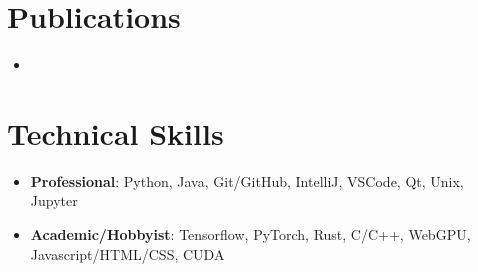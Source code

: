 \documentclass[letterpaper,10pt]{article}
\newcommand{\resumeItem}[1]{\item\small{#1}}
\newcommand{\resumeSubHeadingList}{\begin{itemize}[leftmargin=0.15in, label={}]}
\newcommand{\resumeSubHeadingListEnd}{\end{itemize}}
\begin{document}
\section{Publications}
\resumeSubHeadingList
\vspace{-1pt}\item
\nocite{*}
\printbibliography[heading=none]
\resumeSubHeadingListEnd

\section{Technical Skills}
\resumeSubHeadingList
  \resumeItem{\textbf{Professional}: Python, Java, Git/GitHub, IntelliJ, VSCode, Qt, Unix, Jupyter}
  \resumeItem{\textbf{Academic/Hobbyist}: Tensorflow, PyTorch, Rust, C/C++, WebGPU, Javascript/HTML/CSS, CUDA}
\resumeSubHeadingListEnd
\end{document}
